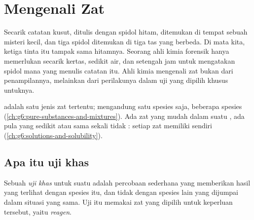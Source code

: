 \chapter{Mengenali Zat}\label{ch:g7:identifying-substances}

Secarik catatan kusut, ditulis dengan spidol hitam, ditemukan di tempat
sebuah misteri kecil, dan tiga spidol ditemukan di tiga tas yang
berbeda. Di mata kita, ketiga tinta itu tampak sama hitamnya. Seorang
ahli kimia forensik hanya memerlukan secarik kertas, sedikit air, dan
setengah jam untuk mengatakan spidol mana yang menulis catatan itu. Ahli
kimia mengenali zat bukan dari penampilannya, melainkan dari
perilakunya dalam uji yang dipilih khusus untuknya.

\begin{recall}
 adalah satu jenis zat tertentu;  mengandung satu
spesies saja,  beberapa spesies
(\cref{ch:g6:pure-substances-and-mixtures}). Ada zat yang mudah 
dalam suatu , ada pula yang sedikit atau sama sekali tidak :
setiap zat memiliki  sendiri
(\cref{ch:g6:solutions-and-solubility}).
\end{recall}

\section{Apa itu uji khas}

\begin{definition}\label{def:g7:identifying-substances:characteristic-test}
Sebuah \emph{uji khas} untuk suatu 
adalah percobaan sederhana yang memberikan hasil yang terlihat dengan
spesies itu, dan tidak dengan spesies lain yang dijumpai dalam situasi
yang sama. Uji itu memakai zat yang dipilih untuk keperluan tersebut,
yaitu \emph{reagen}.
\end{definition}


